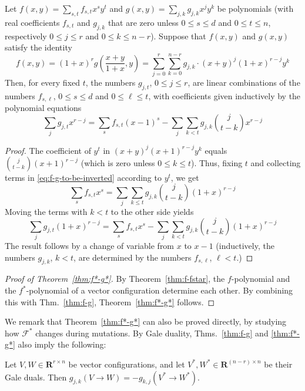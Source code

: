\documentclass[a4paper,USenglish,cleveref, autoref, thm-restate,nolineno]{socg-lipics-v2021}
\renewcommand{\leq}{\leqslant}
\newcommand{\R}{\mathbf{R}}
\begin{document}
\begin{lemma} 
\label{lem:g-f}
Let $f(x,y)=\sum_{s,t}f_{s,t}x^sy^t$ and $g(x,y)=\sum_{j,k} g_{j,k} x^j y^k$ be polynomials (with real coefficients $f_{s,t}$ and $g_{j,k}$ that are zero unless $0\leq s\leq d$ and $0\leq t\leq n$, respectively $0\leq j\leq r$ and $0\leq k\leq n-r$). Suppose that $f(x,y)$ and $g(x,y)$ satisfy the identity
\begin{equation}
\label{eq:f-g-to-be-inverted} 
f(x,y)= (1+x)^r g (\textstyle \frac{x+y}{1+x},y)=\sum_{j=0}^r \sum_{k=0}^{n-r} g_{j,k}\cdot (x+y)^j (1+x)^{r-j} y^k
\end{equation}
Then, for every fixed $t$, the numbers $g_{j,t}$, $0\leq j\leq r$, are linear combinations of the numbers $f_{s,\ell}$, $0\leq s\leq d$ and $0\leq \ell \leq t$, with coefficients given inductively by the polynomial equations 
\[
\sum_j g_{j,t} x^{r-j} = \sum_s f_{s,t} (x-1)^s - \sum_j \sum_{k<t} g_{j,k}\binom{j}{t-k}x^{r-j}
\]
\end{lemma}
\begin{proof}
The coefficient of $y^t$ in $(x+y)^j (x+1)^{r-j}y^k$ equals $\binom{j}{t-k}(x+1)^{r-j}$ (which is zero unless $0\leq k\leq t$). Thus, fixing $t$ and collecting terms in \eqref{eq:f-g-to-be-inverted} according to $y^t$, we get
\[
\sum_s f_{s,t} x^s =\sum_j \sum_{k\leq t} g_{j,k}\binom{j}{t-k}(1+x)^{r-j}
\]
Moving the terms with $k<t$ to the other side yields
\[
\sum_j g_{j,t} (1+x)^{r-j} = \sum_s f_{s,t} x^s - \sum_j \sum_{k<t} g_{j,k}\binom{j}{t-k}(1+x)^{r-j}
\]
The result follows by a change of variable from $x$ to $x-1$ (inductively, the numbers $g_{j,k}$, $k<t$, are determined by the numbers $f_{s,\ell}$, $\ell<t$.)
\end{proof}

\begin{proof}[Proof of Theorem~\ref{thm:f*-g*}] 
By Theorem~\ref{thm:f-fstar}, the $f$-polynomial and the $f^*$-polynomial of a vector configuration determine each other. By combining this with Thm.~\ref{thm:f-g}, Theorem~\ref{thm:f*-g*} follows.\end{proof}

We remark that Theorem~\ref{thm:f*-g*} can also be proved directly, by studying how $\mathcal{F}^*$ changes during mutations. By Gale duality, Thms.~\ref{thm:f-g} and \ref{thm:f*-g*} also imply the following:

\begin{corollary}
\label{cor:g-pair-dual}
Let $V,W\in \R^{r\times n}$ be vector configurations, and let $V^*,W^*\in  \R^{(n-r)\times n}$ be their Gale duals. Then $g_{j,k}(V \to W) = -g_{k,j}(V^* \to W^*)$.
\end{corollary}
\end{document}
